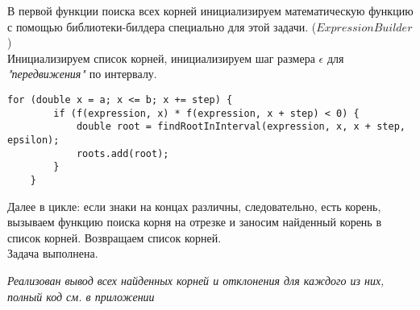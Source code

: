 В первой функции поиска всех корней инициализируем математическую функцию с помощью
библиотеки-билдера специально для этой задачи. ($ExpressionBuilder$)\\

Инициализируем список корней, инициализируем шаг размера $\epsilon$ для \textit{"передвижения"} по интервалу.\\

\begin{lstlisting}[style=JavaStyle, caption={Java Code, Main cycle}]
for (double x = a; x <= b; x += step) {
        if (f(expression, x) * f(expression, x + step) < 0) {
            double root = findRootInInterval(expression, x, x + step, epsilon);
            roots.add(root);
        }
    }
\end{lstlisting}
Далее в цикле: если знаки на концах различны, следовательно, есть корень,
вызываем функцию поиска корня на отрезке и заносим найденный корень в список корней.
Возвращаем список корней.\\
Задача выполнена.
\begin{center}
    \textit{Реализован вывод всех найденных корней и отклонения для каждого из них,\\
    полный код см. в приложении}
\end{center}

